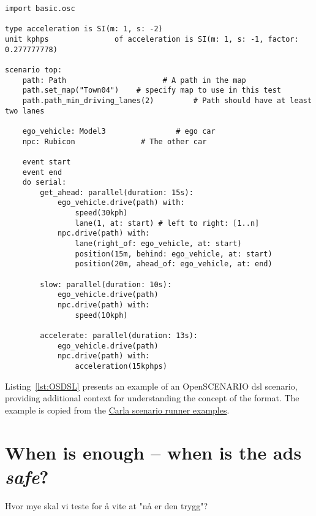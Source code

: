 \begin{lstlisting}[label={lst:OSDSL}, caption={An example of an OpenSCENARIO \acrshort{dsl} scenario.}]
import basic.osc

type acceleration is SI(m: 1, s: -2)
unit kphps               of acceleration is SI(m: 1, s: -1, factor: 0.277777778)

scenario top:
    path: Path                      # A path in the map
    path.set_map("Town04")    # specify map to use in this test
    path.path_min_driving_lanes(2)         # Path should have at least two lanes

    ego_vehicle: Model3                # ego car
    npc: Rubicon               # The other car

    event start
    event end
    do serial:
        get_ahead: parallel(duration: 15s):
            ego_vehicle.drive(path) with:
                speed(30kph)
                lane(1, at: start) # left to right: [1..n]
            npc.drive(path) with:
                lane(right_of: ego_vehicle, at: start)
                position(15m, behind: ego_vehicle, at: start)
                position(20m, ahead_of: ego_vehicle, at: end)       

        slow: parallel(duration: 10s):
            ego_vehicle.drive(path)
            npc.drive(path) with:
                speed(10kph)

        accelerate: parallel(duration: 13s):
            ego_vehicle.drive(path)
            npc.drive(path) with:
                acceleration(15kphps)
\end{lstlisting}

Listing~\ref{lst:OSDSL} presents an example of an OpenSCENARIO \acrshort{dsl} scenario, providing
additional context for understanding the concept of the format. The example is copied
from the \href{https://github.com/carla-simulator/scenario_runner/blob/master/srunner/examples/acceleration.osc}{Carla scenario runner examples}.

\section{When is enough -- when is the \acrshort{ads} \emph{safe}?}

Hvor mye skal vi teste for å vite at "nå er den trygg"?